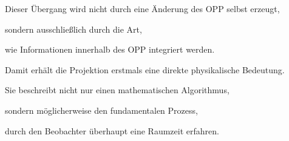 Dieser Übergang wird nicht durch eine Änderung des OPP selbst erzeugt,

sondern ausschließlich durch die Art,

wie Informationen innerhalb des OPP integriert werden.

Damit erhält die Projektion erstmals eine direkte physikalische Bedeutung.

Sie beschreibt nicht nur einen mathematischen Algorithmus,

sondern möglicherweise den fundamentalen Prozess,

durch den Beobachter überhaupt eine Raumzeit erfahren.

